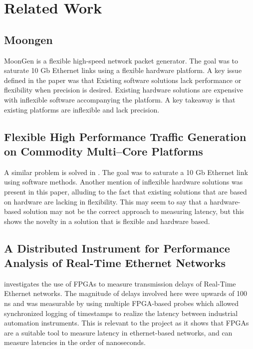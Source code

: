 \section{Related Work}

\subsection{Moongen}

\par MoonGen \cite{moongen} is a flexible high-speed network packet generator. The goal was to saturate 10 Gb Ethernet links using 
a flexible hardware platform. A key issue defined in the paper was that Existing software solutions lack performance
or flexibility when precision is desired. Existing hardware solutions are expensive with inflexible software accompanying
the platform. A key takeaway is that existing platforms are inflexible and lack precision.

\subsection{Flexible High Performance Traffic Generation on Commodity Multi–Core Platforms}

\par A similar problem is solved in \cite{multicore}. The goal was to saturate a 10 Gb Ethernet link using software methods.
Another mention of inflexible hardware solutions was present in this paper, alluding to the fact that existing
solutions that are based on hardware are lacking in flexibility. This may seem to say that a hardware-based solution may
not be the correct approach to measuring latency, but this shows the novelty in a solution that is flexible
and hardware based.

\subsection{A Distributed Instrument for Performance Analysis of Real-Time Ethernet Networks}

\cite{realtime} investigates the use of FPGAs to measure transmission delays of Real-Time Ethernet networks. The magnitude
of delays involved here were upwards of 100 ns and was measurable by using multiple FPGA-based probes which allowed 
synchronized logging of timestamps to realize the latency between industrial automation instruments. This is relevant
to the project as it shows that FPGAs are a suitable tool to measure latency in ethernet-based networks, and can
measure latencies in the order of nanoseconds.

